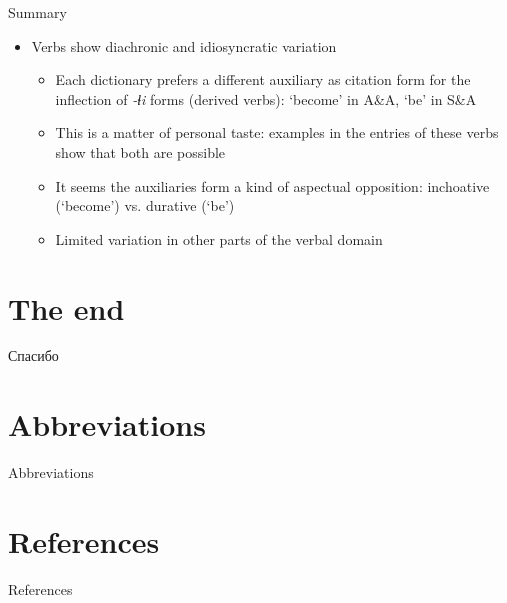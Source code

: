 \begin{frame}{Summary}
    \begin{itemize}
    \item Verbs show diachronic and idiosyncratic variation
        \begin{itemize}
        \item Each dictionary prefers a different auxiliary as citation form for the inflection of \textit{-ɬi} forms (derived verbs): `become' in A\&A, `be' in S\&A
        \item This is a matter of personal taste: examples in the entries of these verbs show that both are possible
        \item It seems the auxiliaries form a kind of aspectual opposition: inchoative (`become') vs. durative (`be') %
        \pause
        \item Limited variation in other parts of the verbal domain
        \end{itemize}
    \end{itemize}
\end{frame}

\section{The end}
\begin{frame}{Спасибо}
\begin{figure}[h]
\centering
{}
\end{figure}
\end{frame}

\section{Abbreviations}
\begin{frame}{Abbreviations}

\tiny{\printglossary}

\end{frame}

\section{References}
\begin{frame}{References}

\printbibliography

\end{frame}

